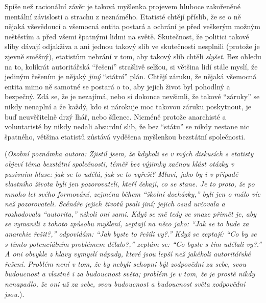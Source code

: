 \documentclass{book}
\begin{document}
Spíše než racionální závěr je taková myšlenka projevem hluboce zakořeněné mentální závislosti a strachu z neznámého. Etatisté chtějí příslib, že se o ně nějaká vševědoucí a všemocná entita postará a ochrání je před veškerým možným neštěstím a před všemi špatnými lidmi na světě. Skutečnost, že politici takové sliby dávají odjakživa a ani jednou takový slib ve skutečnosti nesplnili (protože je zjevně směšný), etatistům nebrání v tom, aby takový slib chtěli \emph{slyšet}. Bez ohledu na to, kolikrát autoritářská \enquote{řešení} strašlivě selžou, si většina lidí stále myslí, že jediným řešením je nějaký \emph{jiný} \enquote{státní} plán. Chtějí záruku, že nějaká všemocná entita mimo ně samotné se postará o to, aby jejich život byl pohodlný a bezpečný. Zdá se, že je nezajímá, nebo si dokonce nevšimli, že takové \enquote{záruky} se nikdy nenaplní a že každý, kdo si nárokuje moc takovou záruku poskytnout, je buď neuvěřitelně drzý lhář, nebo šílenec. Nicméně protože anarchisté a voluntaristé by nikdy nedali absurdní slib, že bez \enquote{státu} se nikdy nestane nic špatného, většina etatistů zůstává vyděšena myšlenkou bezstátní společnosti.

(\emph{Osobní poznámka autora: Zjistil jsem, že kdykoli se v mých diskusích s etatisty objeví téma bezstátní společnosti, téměř bez výjimky začnou klást otázky v pasivním hlase: jak se to udělá, jak se to vyřeší? Mluví, jako by i v případě vlastního života byli jen pozorovateli, kteří čekají, co se stane. Je to proto, že po mnoho let svého formování, zejména během \enquote{školní docházky,} byli jen o málo víc než pozorovateli. Scénáře jejich životů psali jiní; jejich osud určovala a rozhodovala \enquote{autorita,} nikoli oni sami. Když se mě tedy ve snaze přimět je, aby se vymanili z tohoto způsobu myšlení, zeptají na něco jako: \enquote{Jak se to bude za anarchie řešit?,} odpovídám: \enquote{Jak byste to řešili vy?.} Když se zeptají: \enquote{Co by se s tímto potenciálním problémem dělalo?,} zeptám se: \enquote{Co byste s tím udělali vy?.} A oni obvykle z hlavy vymyslí nápady, které jsou lepší než jakékoli autoritářské řešení. Problém není v tom, že by nebyli schopni být zodpovědní za sebe, svou budoucnost a vlastně i za budoucnost světa; problém je v tom, že je prostě nikdy nenapadlo, že oni už za sebe, svou budoucnost a budoucnost světa zodpovědní jsou.}).
\end{document}
